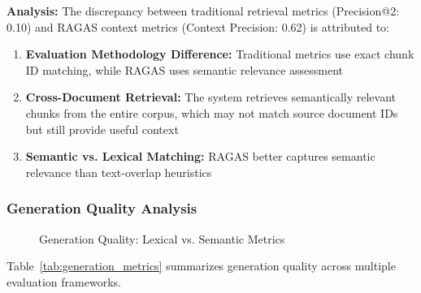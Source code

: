\textbf{Analysis:} The discrepancy between traditional retrieval metrics (Precision@2: 0.10) and RAGAS context metrics (Context Precision: 0.62) is attributed to:

\begin{enumerate}
    \item \textbf{Evaluation Methodology Difference:} Traditional metrics use exact chunk ID matching, while RAGAS uses semantic relevance assessment
    \item \textbf{Cross-Document Retrieval:} The system retrieves semantically relevant chunks from the entire corpus, which may not match source document IDs but still provide useful context
    \item \textbf{Semantic vs. Lexical Matching:} RAGAS better captures semantic relevance than text-overlap heuristics
\end{enumerate}

\subsubsection{Generation Quality Analysis}

\begin{figure}[htbp]
    \centering
    \caption{Generation Quality: Lexical vs. Semantic Metrics}
    \label{fig:generation_quality}
\end{figure}

Table~\ref{tab:generation_metrics} summarizes generation quality across multiple evaluation frameworks.


